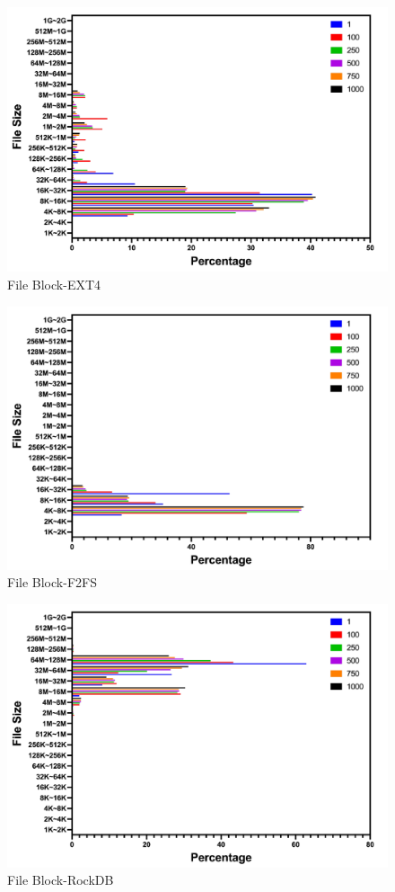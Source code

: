 \begin{figure}[t]
    \centering
	\includegraphics[width=0.95\columnwidth]{graphs/file_block_ext4}
	\caption{File Block-EXT4}
	\label{f:file_block_ext4}
\end{figure}

\begin{figure}[t]
    \centering
	\includegraphics[width=0.95\columnwidth]{graphs/file_block_f2fs}
	\caption{File Block-F2FS}
	\label{f:file_block_f2fs}
\end{figure}

\begin{figure}[t]
    \centering
	\includegraphics[width=0.95\columnwidth]{graphs/file_block_rocksdb}
	\caption{File Block-RockDB}
	\label{f:file_block_rocksdb}
\end{figure}


